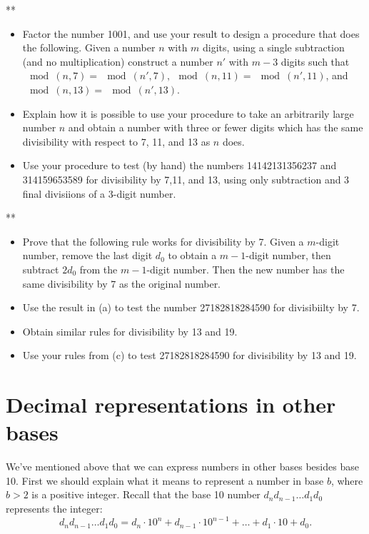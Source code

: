 \begin{exercise}{}**
\begin{itemize}
\item
Factor the number 1001, and use your result to design a procedure that does the following.  Given a number $n$ with $m$ digits, using a single subtraction (and no multiplication)  construct a number $n'$ with $m-3$ digits such that $ \mod(n,7) = \mod(n',7), \mod(n,11) = \mod(n',11)$, and $\mod(n,13) = \mod(n',13)$.  
\item
Explain how it is possible to use your procedure to take an arbitrarily large number $n$ and obtain a number with three or fewer digits which has the same divisibility with respect to 7, 11, and 13 as $n$ does.
\item
Use your procedure to test (by hand)  the numbers 14142131356237 and 314159653589 for divisibility by 7,11, and 13, using only subtraction and 3 final divisiions of a 3-digit number.
\end{itemize}
\end{exercise}

\begin{exercise}{}**
\begin{itemize}
\item
Prove that the following rule works for divisibility by 7.  Given a $m$-digit number, remove the last digit $d_0$ to obtain a $m-1$-digit number, then subtract $2d_0$ from the $m-1$-digit number.  Then the new number has the same divisibility by 7 as the original number.
\item
Use the result in (a) to test the number 27182818284590 for divisibiilty by 7.
\item
Obtain similar rules for divisibility by 13 and 19.
\item Use your rules from (c) to test 27182818284590 for divisibility by 13 and 19.
\end{itemize}
\end{exercise}


\section{Decimal representations in other bases}

We've mentioned above that we can express numbers in other bases besides base 10.  First we should explain what 
it means to represent a number in base $b$, where $b>2$ is a positive integer.  Recall that the base 10 number $d_n d_{n-1} \ldots d_1 d_0$ 
represents the integer:
\begin{equation*}
d_n d_{n-1} \ldots d_1 d_0 = d_n \cdot 10^n + d_{n-1}\cdot 10^{n-1} + \ldots + d_1 \cdot 10 + d_0.
\end{equation*}

